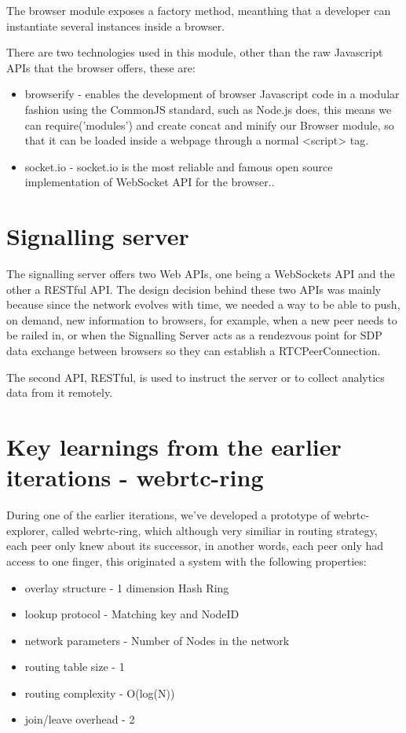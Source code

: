 The browser module exposes a factory method, meanthing that a developer can instantiate several instances inside a browser.

There are two technologies used in this module, other than the raw Javascript APIs that the browser offers, these are:

\begin{itemize}
    \item browserify - enables the development of browser Javascript code in a modular fashion using the CommonJS standard, such as Node.js does, this means we can require('modules') and create concat and minify our Browser module, so that it can be loaded inside a webpage through a normal <script> tag.
    \item socket.io - socket.io is the most reliable and famous open source implementation of WebSocket API for the browser..
\end{itemize}

\section{Signalling server}

The signalling server offers two Web APIs, one being a WebSockets API and the other a RESTful API. The design decision behind these two APIs was mainly because since the network evolves with time, we needed a way to be able to push, on demand, new information to browsers, for example, when a new peer needs to be railed in, or when the Signalling Server acts as a rendezvous point for SDP data exchange between browsers so they can establish a RTCPeerConnection.

The second API, RESTful, is used to instruct the server or to collect analytics data from it remotely.

\section{Key learnings from the earlier iterations - webrtc-ring}

During one of the earlier iterations, we've developed a prototype of webrtc-explorer, called webrtc-ring, which although very similiar in routing strategy, each peer only knew about its successor, in another words, each peer only had access to one finger, this originated a system with the following properties:

\begin{itemize}
    \item overlay structure - 1 dimension Hash Ring
    \item lookup protocol - Matching key and NodeID
    \item network parameters - Number of Nodes in the network
    \item routing table size - 1
    \item routing complexity - O(log(N))
    \item join/leave overhead - 2
\end{itemize}

